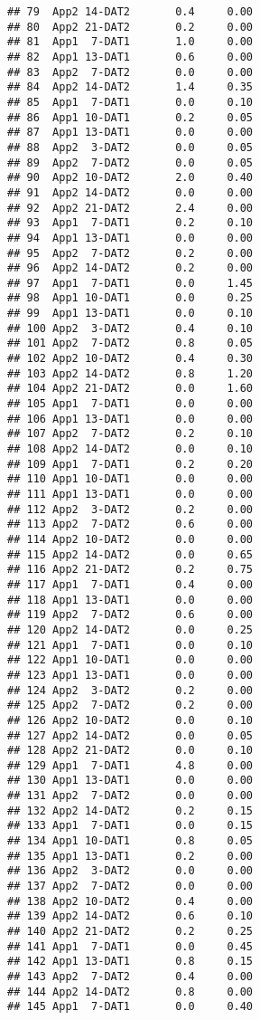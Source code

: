 \documentclass[
]{article}
\begin{document}
\begin{verbatim}
## 79  App2 14-DAT2       0.4     0.00
## 80  App2 21-DAT2       0.2     0.00
## 81  App1  7-DAT1       1.0     0.00
## 82  App1 13-DAT1       0.6     0.00
## 83  App2  7-DAT2       0.0     0.00
## 84  App2 14-DAT2       1.4     0.35
## 85  App1  7-DAT1       0.0     0.10
## 86  App1 10-DAT1       0.2     0.05
## 87  App1 13-DAT1       0.0     0.00
## 88  App2  3-DAT2       0.0     0.05
## 89  App2  7-DAT2       0.0     0.05
## 90  App2 10-DAT2       2.0     0.40
## 91  App2 14-DAT2       0.0     0.00
## 92  App2 21-DAT2       2.4     0.00
## 93  App1  7-DAT1       0.2     0.10
## 94  App1 13-DAT1       0.0     0.00
## 95  App2  7-DAT2       0.2     0.00
## 96  App2 14-DAT2       0.2     0.00
## 97  App1  7-DAT1       0.0     1.45
## 98  App1 10-DAT1       0.0     0.25
## 99  App1 13-DAT1       0.0     0.10
## 100 App2  3-DAT2       0.4     0.10
## 101 App2  7-DAT2       0.8     0.05
## 102 App2 10-DAT2       0.4     0.30
## 103 App2 14-DAT2       0.8     1.20
## 104 App2 21-DAT2       0.0     1.60
## 105 App1  7-DAT1       0.0     0.00
## 106 App1 13-DAT1       0.0     0.00
## 107 App2  7-DAT2       0.2     0.10
## 108 App2 14-DAT2       0.0     0.10
## 109 App1  7-DAT1       0.2     0.20
## 110 App1 10-DAT1       0.0     0.00
## 111 App1 13-DAT1       0.0     0.00
## 112 App2  3-DAT2       0.2     0.00
## 113 App2  7-DAT2       0.6     0.00
## 114 App2 10-DAT2       0.0     0.00
## 115 App2 14-DAT2       0.0     0.65
## 116 App2 21-DAT2       0.2     0.75
## 117 App1  7-DAT1       0.4     0.00
## 118 App1 13-DAT1       0.0     0.00
## 119 App2  7-DAT2       0.6     0.00
## 120 App2 14-DAT2       0.0     0.25
## 121 App1  7-DAT1       0.0     0.10
## 122 App1 10-DAT1       0.0     0.00
## 123 App1 13-DAT1       0.0     0.00
## 124 App2  3-DAT2       0.2     0.00
## 125 App2  7-DAT2       0.2     0.00
## 126 App2 10-DAT2       0.0     0.10
## 127 App2 14-DAT2       0.0     0.05
## 128 App2 21-DAT2       0.0     0.10
## 129 App1  7-DAT1       4.8     0.00
## 130 App1 13-DAT1       0.0     0.00
## 131 App2  7-DAT2       0.0     0.00
## 132 App2 14-DAT2       0.2     0.15
## 133 App1  7-DAT1       0.0     0.15
## 134 App1 10-DAT1       0.8     0.05
## 135 App1 13-DAT1       0.2     0.00
## 136 App2  3-DAT2       0.0     0.00
## 137 App2  7-DAT2       0.0     0.00
## 138 App2 10-DAT2       0.4     0.00
## 139 App2 14-DAT2       0.6     0.10
## 140 App2 21-DAT2       0.2     0.25
## 141 App1  7-DAT1       0.0     0.45
## 142 App1 13-DAT1       0.8     0.15
## 143 App2  7-DAT2       0.4     0.00
## 144 App2 14-DAT2       0.8     0.00
## 145 App1  7-DAT1       0.0     0.40

\end{verbatim}
\end{document}
